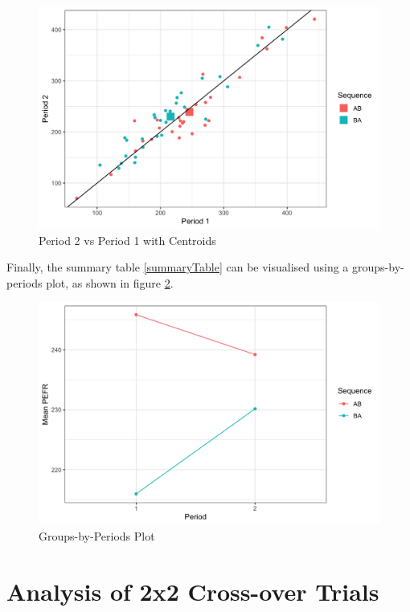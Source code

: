 \documentclass[12pt, TexShade, letterpaper]{report}
\begin{document}
\begin{figure}[ht]
    \centering
    \includegraphics[width=0.85\linewidth]{report/figures/centroidsPlot.png}
    \caption{Period 2 vs Period 1 with Centroids}
    \label{fig:centroids}
\end{figure}

Finally, the summary table \ref{summaryTable} can be visualised using a groups-by-periods plot, as shown in figure \ref{fig:groupsbyperiods}.
\begin{figure}[ht]
    \centering
    \includegraphics[width=0.85\linewidth]{report/figures/groupsByPeriodsPlot.png}
    \caption{Groups-by-Periods Plot}
    \label{fig:groupsbyperiods}
\end{figure}

\chapter{Analysis of 2x2 Cross-over Trials}
\end{document}
